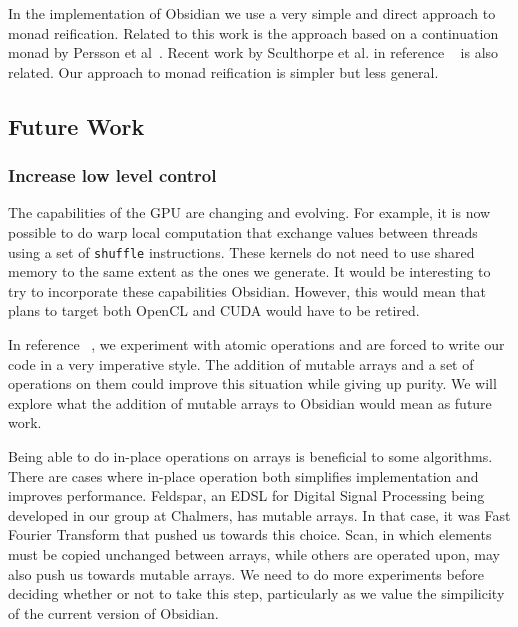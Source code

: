 In the implementation of Obsidian we use a very simple and direct approach 
to monad reification. Related to this work is the approach based on a 
continuation monad by Persson et al~\cite{Generic}. Recent work by Sculthorpe et al. in reference ~\cite{sculthorpe2013constrained} is also related. 
Our approach to monad reification is simpler but less general. 

\subsection{Future Work} 
\label{sec:Future}

\subsubsection{Increase low level control} 

The capabilities of the GPU are changing and evolving. For example, it is now 
possible to do warp local computation that exchange values between threads 
using a set of {\tt shuffle} instructions. These kernels do not need to use 
shared memory to the same extent as the ones we generate. It would be interesting 
to try to incorporate these capabilities Obsidian. However, this 
would mean that plans to target both OpenCL and CUDA would have to be retired. 

In reference ~\cite{CSORT}, we experiment with atomic operations 
and are forced to write our code in a very imperative style. The addition of mutable 
arrays and a set of operations on them could improve this situation 
while giving up purity. We will explore what the addition of mutable arrays to 
Obsidian would mean as future work. 

Being able to do in-place operations on arrays is beneficial to some algorithms. 
There are cases where in-place operation both simplifies implementation and improves performance.
Feldspar, an EDSL for Digital Signal Processing being developed in our group at Chalmers, has mutable arrays. In that case, it was Fast Fourier Transform
that pushed us towards this choice. Scan, in which elements must be copied
unchanged between arrays, while others are operated upon, may also push us towards mutable arrays. We need
to do more experiments before deciding whether or not to take this step,
particularly as we value the simpilicity of the current version of Obsidian.

